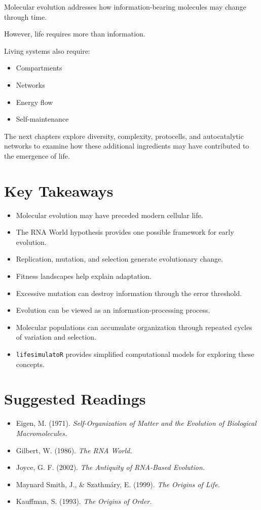 \documentclass[
  oneside,
  openany]{book}
\providecommand{\tightlist}{%
  \setlength{\itemsep}{0pt}\setlength{\parskip}{0pt}}
\begin{document}
Molecular evolution addresses how information-bearing molecules may change through time.

However, life requires more than information.

Living systems also require:

\begin{itemize}
\tightlist
\item
  Compartments
\item
  Networks
\item
  Energy flow
\item
  Self-maintenance
\end{itemize}

The next chapters explore diversity, complexity, protocells, and autocatalytic networks to examine how these additional ingredients may have contributed to the emergence of life.

\section{Key Takeaways}\label{key-takeaways}

\begin{itemize}
\tightlist
\item
  Molecular evolution may have preceded modern cellular life.
\item
  The RNA World hypothesis provides one possible framework for early evolution.
\item
  Replication, mutation, and selection generate evolutionary change.
\item
  Fitness landscapes help explain adaptation.
\item
  Excessive mutation can destroy information through the error threshold.
\item
  Evolution can be viewed as an information-processing process.
\item
  Molecular populations can accumulate organization through repeated cycles of variation and selection.
\item
  \texttt{lifesimulatoR} provides simplified computational models for exploring these concepts.
\end{itemize}

\section{Suggested Readings}\label{suggested-readings}

\begin{itemize}
\tightlist
\item
  Eigen, M. (1971). \emph{Self-Organization of Matter and the Evolution of Biological Macromolecules.}
\item
  Gilbert, W. (1986). \emph{The RNA World.}
\item
  Joyce, G. F. (2002). \emph{The Antiquity of RNA-Based Evolution.}
\item
  Maynard Smith, J., \& Szathmáry, E. (1999). \emph{The Origins of Life.}
\item
  Kauffman, S. (1993). \emph{The Origins of Order.}
\end{itemize}
\end{document}
